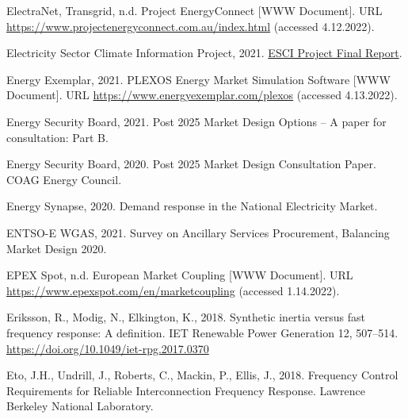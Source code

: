 \documentclass[12pt,a4paper,]{report}
\newlength{\cslhangindent}
\newenvironment{CSLReferences}[2] %
 {%
  \setlength{\parindent}{0pt}
  \ifodd #1 \everypar{\setlength{\hangindent}{\cslhangindent}}\ignorespaces\fi
  \ifnum #2 > 0
  \setlength{\parskip}{#2\baselineskip}
  \fi
 }%
 {}
\begin{document}
\begin{CSLReferences}{1}{0}
\leavevmode{}%
ElectraNet, Transgrid, n.d. Project {EnergyConnect} {[}WWW Document{]}.
URL \url{https://www.projectenergyconnect.com.au/index.html} (accessed
4.12.2022).

\leavevmode{}%
Electricity Sector Climate Information Project, 2021.
\href{https://www.climatechangeinaustralia.gov.au/media/ccia/2.2/cms_page_media/799/ESCI\%20Project\%20final\%20report_210721.pdf}{{ESCI
Project Final Report}}.

\leavevmode{}%
Energy Exemplar, 2021. {PLEXOS} \textbar{} {Energy Market Simulation
Software} {[}WWW Document{]}. URL
\url{https://www.energyexemplar.com/plexos} (accessed 4.13.2022).

\leavevmode{}%
Energy Security Board, 2021. Post 2025 {Market Design Options} -- {A}
paper for consultation: {Part B}.

\leavevmode{}%
Energy Security Board, 2020. Post 2025 {Market Design Consultation
Paper}. {COAG Energy Council}.

\leavevmode{}%
Energy Synapse, 2020. Demand response in the {National Electricity
Market}.

\leavevmode{}%
ENTSO-E WGAS, 2021. Survey on {Ancillary Services Procurement},
{Balancing Market Design} 2020.

\leavevmode{}%
EPEX Spot, n.d. European {Market Coupling} {[}WWW Document{]}. URL
\url{https://www.epexspot.com/en/marketcoupling} (accessed 1.14.2022).

\leavevmode{}%
Eriksson, R., Modig, N., Elkington, K., 2018. Synthetic inertia versus
fast frequency response: {A} definition. IET Renewable Power Generation
12, 507--514. \url{https://doi.org/10.1049/iet-rpg.2017.0370}

\leavevmode{}%
Eto, J.H., Undrill, J., Roberts, C., Mackin, P., Ellis, J., 2018.
Frequency {Control Requirements} for {Reliable Interconnection Frequency
Response}. {Lawrence Berkeley National Laboratory}.


\end{CSLReferences}
\end{document}
